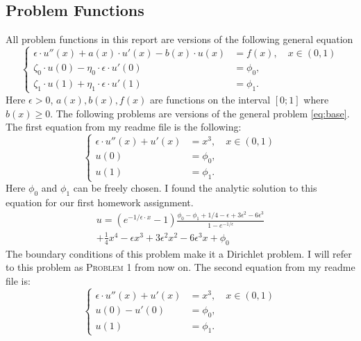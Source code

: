 \documentclass[../00_main.tex]{subfiles}
\begin{document}
\subsection{Problem Functions}

All problem functions in this report are versions of the following general
equation
\begin{equation}\label{eq:base}
    \begin{cases}
        \epsilon \cdot u''(x) + a(x) \cdot u'(x) - b(x) \cdot u(x) &= f(x),
            \quad x \in (0,1) \\
        \zeta_0 \cdot u(0) - \eta_0\cdot\epsilon\cdot u'(0) &= \phi_0,   \\
        \zeta_1 \cdot u(1) + \eta_1\cdot\epsilon\cdot u'(1) &= \phi_1.
    \end{cases}
\end{equation}
Here $\epsilon > 0$, $a(x), b(x), f(x)$ are functions on the interval $[0;1]$
where $b(x) \ge 0$. The following problems are versions of the general problem 
\eqref{eq:base}. The first equation from my readme file is the following:
\begin{equation}\label{eq:bvp1}
    \begin{cases}
        \epsilon \cdot u''(x) + u'(x) &= x^3,
            \quad x \in (0,1) \\
        u(0) &= \phi_0,   \\
        u(1) &= \phi_1.
    \end{cases}
\end{equation}
Here $\phi_0$ and $\phi_1$ can be freely chosen. I found the analytic 
solution to this equation for our first homework assignment. 
\begin{equation}\nonumber
    \begin{gathered}
        u = (e^{-1/\epsilon\cdot x} - 1) 
            \frac{\phi_0 - \phi_1 + 1/4 - \epsilon+3 \epsilon^2
            - 6 \epsilon^3} {1 - e^{-1/\epsilon}}\\
         + \frac{1}{4}x^4-\epsilon x^3+3\epsilon^2 x^2-6\epsilon^3 x+\phi_0
    \end{gathered}
\end{equation}
The boundary conditions of this problem make it a Dirichlet problem. I will
refer to this problem as \textsc{Problem 1} from now on. The second equation 
from my readme file is:
\begin{equation}\label{eq:bvp2}
    \begin{cases}
        \epsilon \cdot u''(x) + u'(x) &= x^3,
            \quad x \in (0,1) \\
        u(0) - u'(0) &= \phi_0,   \\
        u(1) &= \phi_1.
    \end{cases}
\end{equation}
\end{document}
